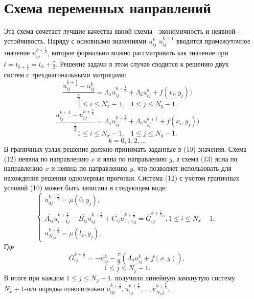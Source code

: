 \documentclass[a4paper, 12pt]{article}
\begin{document}
	\section{Схема переменных направлений}
	Эта схема  сочетает лучшие качества явной схемы - экономичность и неявной - устойчивость. Наряду с основными значениями $u^{k}_{i j}$ $u^{k+1}_{i j}$ вводится промежуточное значение $u^{k+\frac{1}{2}}_{i j}$, которое формально можно рассматривать как значение при $t = t_{k+\frac{1}{2}} = t_k + \frac{\tau}{2}$. Решение задачи в этом случае сводится к решению двух систем с трехдиагональными матрицами:
	\begin{equation}
		\frac{u^{k+\frac{1}{2}}_{i j} - u^{k}_{i j}}{\frac{\tau}{2}} = \Lambda_1 u^{k+\frac{1}{2}}_{i j} + \Lambda_2 u^{k}_{i j} + f(x_i, y_j))
	\end{equation}
	$$1 \le i \le N_x-1, \;\;\; 1 \le j \le N_y-1.$$
	\begin{equation}
		\frac{u^{k+1}_{i j} - u^{k+\frac{1}{2}}_{i j}}{\frac{\tau}{2}} = \Lambda_1 u^{k+\frac{1}{2}}_{i j} + \Lambda_2 u^{k+1}_{i j} + f(x_i, y_j))
	\end{equation}
	$$1 \le i \le N_x-1, \;\;\; 1 \le j \le N_y-1.$$
	$$k = 0, 1, 2, ...$$
	В граничных узлах решение должно принимать заданные в (10) значения.
	\newline
	Схема (12) неявна по направлению $x$ и явна по направлению $y$, а схема (13) ясна по направлению $x$ и неявна по направлению $y$, что позволяет использовать для нахождения решения одномерные прогонки.
	\newline
	Система (12) с учётом граничных условий (10) может быть записана в следующем виде:
	\begin{equation}
		\begin{cases}
			u^{k + \frac{1}{2}}_{0 j} = \mu(0, y_j), \\
			\overline{A_{i j}} u^{k + \frac{1}{2}}_{i-1 j} - \overline{B_{i j}} u^{k + \frac{1}{2}}_{i j} + \overline{C_{i j}} u^{k + \frac{1}{2}}_{i+1 j} = \overline{G}^{k+\frac{1}{2}_{ij}}_{i j}, 1 \le i \le N_x-1, \\
			u^{k + \frac{1}{2}}_{N_x j} = \mu(l_x, y_j).
		\end{cases}
	\end{equation}
	\newpage
	Где
	\begin{equation}
		\overline{G}^{k+\frac{1}{2}}_{i j} = -u^k_{i j} - \frac{\tau}{2} (\Lambda_2 u^k_{i j} + f(x, y)),
	\end{equation}
	$$1 \le j \le N_y-1.$$
	В итоге при каждом $1 \le j \le N_y-1.$ получили линейную замкнутую систему $N_x+1$-ого порядка относительно $u^{k + \frac{1}{2}}_{0 j}, u^{k + \frac{1}{2}}_{1 j}, ... , u^{k + \frac{1}{2}}_{N_x j}.$
\end{document}
